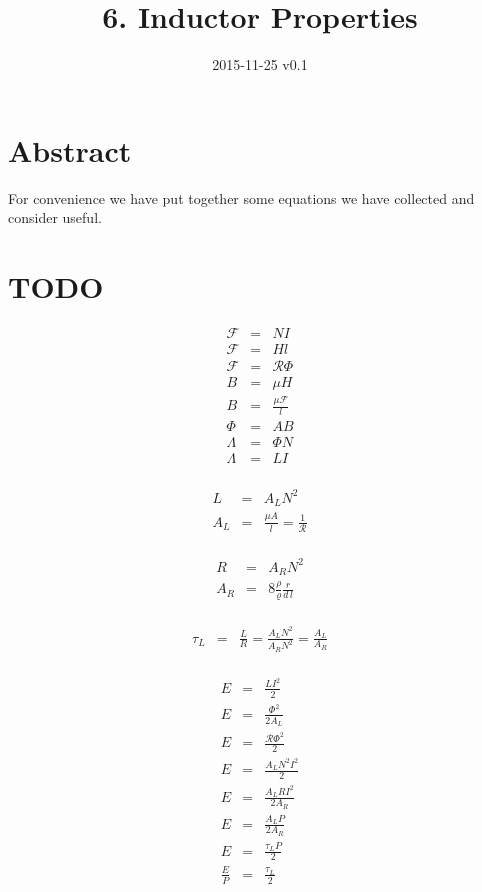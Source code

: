 \documentclass[]{../common/elementary-physics}
\title{6. Inductor Properties}
\date{2015-11-25 v0.1}
\begin{document}
\maketitle

\tableofcontents


\section{Abstract}

For convenience we have put together some equations we have collected and consider useful.

\section{TODO}

\begin{eqnarray}
\mathcal{F} &=& N I \\
\mathcal{F} &=& H l \\
\mathcal{F} &=& \mathcal{R} \Phi \\
B &=& \mu H \\
B &=& \frac{\mu \mathcal{F}}{l} \\
\Phi &=& A B \\
\Lambda &=& \Phi N \\
\Lambda &=& L I \\
\end{eqnarray}

\begin{eqnarray}
L &=& A_L N^2 \\
A_L &=& \frac{\mu A}{l} = \frac{1}{\mathcal{R}} \\
\end{eqnarray}

\begin{eqnarray}
R &=& A_R N^2 \\
A_R &=& 8 \frac{\rho}{\varrho} \frac{r}{d \, l} \\
\end{eqnarray}

\begin{eqnarray}
\tau_L &=& \frac{L}{R} = \frac{A_L N^2}{A_R N^2} = \frac{A_L}{A_R} \\
\end{eqnarray}

\begin{eqnarray}
E &=& \frac{L I^2}{2} \\
E &=& \frac{{\Phi}^2}{2 A_L} \\
E &=& \frac{\mathcal{R}{\Phi}^2}{2} \\
E &=& \frac{A_L N^2 I^2}{2} \\
E &=& \frac{A_L R I^2}{2 A_R} \\
E &=& \frac{A_L P}{2 A_R} \\
E &=& \frac{\tau_L P}{2} \\
\frac{E}{P} &=& \frac{\tau_L}{2} \\
\end{eqnarray}
\end{document}
